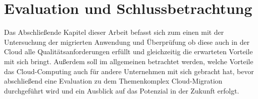 \chapter{Evaluation und Schlussbetrachtung}
Das Abschließende Kapitel dieser Arbeit befasst sich zum einen mit der Untersuchung der migrierten Anwendung und Überprüfung ob diese auch in der Cloud alle Qualitätsanforderungen erfüllt und gleichzeitig die erwarteten Vorteile mit sich bringt. Außerdem soll im allgemeinen betrachtet werden, welche Vorteile das Cloud-Computing auch für andere Unternehmen mit sich gebracht hat, bevor abschließend eine Evaluation zu dem Themenkomplex Cloud-Migration durchgeführt wird und ein Ausblick auf das Potenzial in der Zukunft erfolgt.





